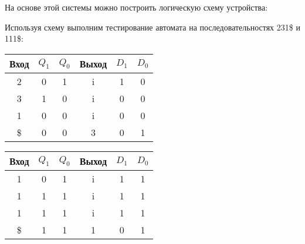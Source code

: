 На основе этой системы можно построить логическую схему устройства:

Используя схему выполним тестирование автомата на последовательностях 231\$ и 111\$:

\begin{table}[H]
    \centering
    \begin{tabular}{|c|cc|c|cc|}
        \hline
        Вход & $Q_1$ & $Q_0$ & Выход & $D_1$ & $D_0$ \\
        \hline
        2  & 0 & 1 & i & 1 & 0 \\
        3  & 1 & 0 & i & 0 & 0 \\
        1  & 0 & 0 & i & 0 & 0 \\
        \$ & 0 & 0 & 3 & 0 & 1 \\
        \hline
    \end{tabular}
    \hfill
    \begin{tabular}{|c|cc|c|cc|}
        \hline
        Вход & $Q_1$ & $Q_0$ & Выход & $D_1$ & $D_0$ \\
        \hline
        1  & 0 & 1 & i & 1 & 1 \\
        1  & 1 & 1 & i & 1 & 1 \\
        1  & 1 & 1 & i & 1 & 1 \\
        \$ & 1 & 1 & 1 & 0 & 1 \\
        \hline
    \end{tabular}
    \hfill
\end{table}

